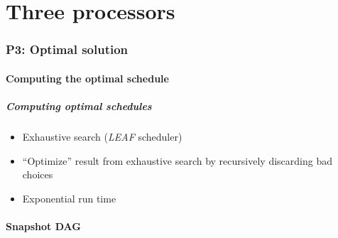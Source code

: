 \documentclass{beamer}
\begin{document}
\part{Three processors}

\section{P3: Optimal solution}

\subsection{Computing the optimal schedule}

\begin{frame}
  \frametitle{Computing optimal schedules}
  \begin{itemize}
  \item Exhaustive search (\emph{LEAF} scheduler)
  \item ``Optimize'' result from exhaustive search by recursively discarding bad choices
  \item Exponential run time
  \end{itemize}
\end{frame}

\subsection{Snapshot DAG}
\end{document}
